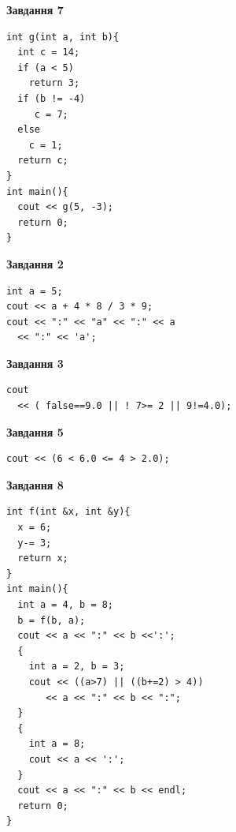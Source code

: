 \documentclass[12pt, ukrainian]{article}
\begin{document}
{\begin {large}
\begin{minipage}[t]{7.0cm}
\begin{center}
\textbf{Завдання 7}
\end{center}
\vspace{-8mm}

\begin{verbatim}
int g(int a, int b){
  int c = 14;
  if (a < 5)
    return 3;
  if (b != -4)
     c = 7;
  else
    c = 1;
  return c;
}
int main(){
  cout << g(5, -3);
  return 0;
}
\end{verbatim}

\end{minipage}
\vline \hspace{1mm}
\begin{minipage}[t]{11.0cm}

\begin{center}
\textbf{Завдання 2}
\end{center}
\vspace{-8mm}

\begin{verbatim}
int a = 5;
cout << a + 4 * 8 / 3 * 9;
cout << ":" << "a" << ":" << a 
  << ":" << 'a';
\end{verbatim}



\begin{center}
\textbf{Завдання 3}
\end{center}
\vspace{-8mm}

\begin{verbatim}
cout 
  << ( false==9.0 || ! 7>= 2 || 9!=4.0);
\end{verbatim}



\begin{center}
\textbf{Завдання 5}
\end{center}
\vspace{-8mm}

\begin{verbatim}
cout << (6 < 6.0 <= 4 > 2.0);
\end{verbatim}



\begin{center}
\textbf{Завдання 8}
\end{center}
\vspace{-8mm}

\begin{verbatim}
int f(int &x, int &y){
  x = 6;
  y-= 3;
  return x;
}
int main(){
  int a = 4, b = 8;
  b = f(b, a);
  cout << a << ":" << b <<':';
  {
    int a = 2, b = 3;
    cout << ((a>7) || ((b+=2) > 4))
       << a << ":" << b << ":";
  }
  {
    int a = 8;
    cout << a << ':';
  }
  cout << a << ":" << b << endl;
  return 0;
}
\end{verbatim}


\end{minipage}
\end{large}}
\end{document}
